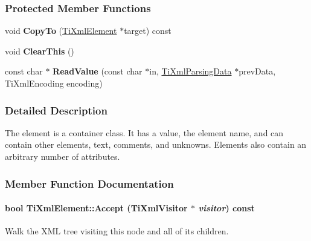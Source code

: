 \subsubsection*{Protected Member Functions}
\begin{DoxyCompactItemize}
\item 
\hypertarget{class_ti_xml_element_a9e0c1983b840de4134f1f6bf7af00b0f}{
void {\bfseries CopyTo} (\hyperlink{class_ti_xml_element}{TiXmlElement} $\ast$target) const }
\label{class_ti_xml_element_a9e0c1983b840de4134f1f6bf7af00b0f}

\item 
\hypertarget{class_ti_xml_element_a5670933ec2d7d9763b9891acc05d7f7d}{
void {\bfseries ClearThis} ()}
\label{class_ti_xml_element_a5670933ec2d7d9763b9891acc05d7f7d}

\item 
\hypertarget{class_ti_xml_element_ac786bce103042d3837c4cc2ff6967d41}{
const char $\ast$ {\bfseries ReadValue} (const char $\ast$in, \hyperlink{class_ti_xml_parsing_data}{TiXmlParsingData} $\ast$prevData, TiXmlEncoding encoding)}
\label{class_ti_xml_element_ac786bce103042d3837c4cc2ff6967d41}

\end{DoxyCompactItemize}


\subsubsection{Detailed Description}
The element is a container class. It has a value, the element name, and can contain other elements, text, comments, and unknowns. Elements also contain an arbitrary number of attributes. 

\subsubsection{Member Function Documentation}
\hypertarget{class_ti_xml_element_a31ab28cc3b892a69254391d6bbe08df3}{
\paragraph[{Accept}]{\setlength{\rightskip}{0pt plus 5cm}bool TiXmlElement::Accept ({\bf TiXmlVisitor} $\ast$ {\em visitor}) const}\hfill}
\label{class_ti_xml_element_a31ab28cc3b892a69254391d6bbe08df3}
Walk the XML tree visiting this node and all of its children. 

